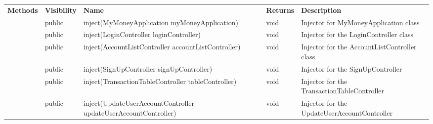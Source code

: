 \documentclass[12pt]{article}
\begin{document}
\begin{table}[H]
{\begin{tabular}{|l|l|l|l|l|}
\multirow{7}{*}{\textbf{Methods}} & \textbf{Visibility}   & \textbf{Name}                                                     & \textbf{Returns}   & \textbf{Description}                          \\ \cline{2-5}
                                  & public                & inject(MyMoneyApplication myMoneyApplication)                     & void               & Injector for MyMoneyApplication class         \\ \cline{2-5}
                                  & public                & inject(LoginController loginController)                           & void               & Injector for the LoginController class        \\ \cline{2-5}
                                  & public                & inject(AccountListController accountListController)               & void               & Injector for the AccountListController class  \\ \cline{2-5}
                                  & public                & inject(SignUpController signUpController)                         & void               & Injector for the SignUpController             \\ \cline{2-5}
                                  & public                & inject(TransactionTableController tableController)                & void               & Injector for the TransactionTableController   \\ \cline{2-5}
                                  & public                & inject(UpdateUserAccountController updateUserAccountController)   & void               & Injector for the UpdateUserAccountController  \\ \hline
\end{tabular}
}
\end{table}
\end{document}

